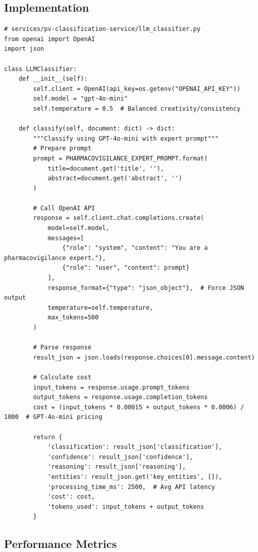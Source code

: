 \subsection{Implementation}

\begin{lstlisting}[style=pythonstyle]
# services/pv-classification-service/llm_classifier.py
from openai import OpenAI
import json

class LLMClassifier:
    def __init__(self):
        self.client = OpenAI(api_key=os.getenv("OPENAI_API_KEY"))
        self.model = "gpt-4o-mini"
        self.temperature = 0.5  # Balanced creativity/consistency
    
    def classify(self, document: dict) -> dict:
        """Classify using GPT-4o-mini with expert prompt"""
        # Prepare prompt
        prompt = PHARMACOVIGILANCE_EXPERT_PROMPT.format(
            title=document.get('title', ''),
            abstract=document.get('abstract', '')
        )
        
        # Call OpenAI API
        response = self.client.chat.completions.create(
            model=self.model,
            messages=[
                {"role": "system", "content": "You are a pharmacovigilance expert."},
                {"role": "user", "content": prompt}
            ],
            response_format={"type": "json_object"},  # Force JSON output
            temperature=self.temperature,
            max_tokens=500
        )
        
        # Parse response
        result_json = json.loads(response.choices[0].message.content)
        
        # Calculate cost
        input_tokens = response.usage.prompt_tokens
        output_tokens = response.usage.completion_tokens
        cost = (input_tokens * 0.00015 + output_tokens * 0.0006) / 1000  # GPT-4o-mini pricing
        
        return {
            'classification': result_json['classification'],
            'confidence': result_json['confidence'],
            'reasoning': result_json['reasoning'],
            'entities': result_json.get('key_entities', []),
            'processing_time_ms': 2500,  # Avg API latency
            'cost': cost,
            'tokens_used': input_tokens + output_tokens
        }
\end{lstlisting}

\subsection{Performance Metrics}

